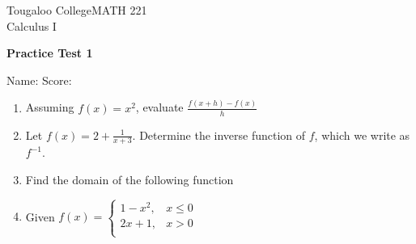 \documentclass{exam}
\def\ans#1{\hfill \textcolor{lightgray}{#1}}
\begin{document}
\noindent
Tougaloo College\hfill MATH 221 \\
Calculus I \hfill 
\begin{center}
{\bf Practice Test 1}
\end{center}

\medskip
\noindent
Name:\underline{\hspace{3in}} \hfill Score:\underline{\hspace{0.8in}}

\medskip
\begin{enumerate}
\item
Assuming $f(x)=x^{2}$, evaluate 
$\frac{f(x+h)-f(x)}{h}$
\vfill

%

\item Let $f(x) = 2+ \frac{1}{x+3}.$ Determine the inverse function of $f$, which we write as $f^{-1}$.
\vfill



\item
Find the domain of the following function

\newpage
\item
Given 
$  f(x)=\left\{
\begin{array}{ll}
      1-x^{2},& x\leq 0\\
      2x+1,   & x>0 \\
\end{array} 
\right. $


\end{enumerate}
\end{document}
